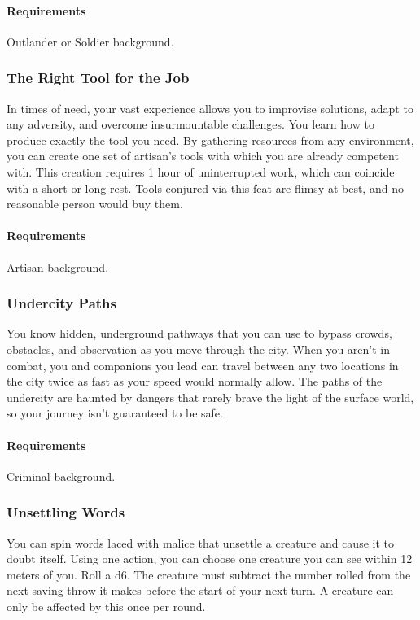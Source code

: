     \paragraph{Requirements} Outlander or Soldier background.
\subsubsection{The Right Tool for the Job} \label{feat::therighttoolforthejob}
    In times of need, your vast experience allows you to improvise solutions, adapt to any adversity, and overcome insurmountable challenges.
    You learn how to produce exactly the tool you need.
    By gathering resources from any environment, you can create one set of artisan's tools with which you are already competent with.
    This creation requires 1 hour of uninterrupted work, which can coincide with a short or long rest.
    Tools conjured via this feat are flimsy at best, and no reasonable person would buy them.
    \paragraph{Requirements} Artisan background.
\subsubsection{Undercity Paths} \label{feat::undercitypaths}
    You know hidden, underground pathways that you can use to bypass crowds, obstacles, and observation as you move through the city.
    When you aren't in combat, you and companions you lead can travel between any two locations in the city twice as fast as your speed would normally allow.
    The paths of the undercity are haunted by dangers that rarely brave the light of the surface world, so your journey isn't guaranteed to be safe.
    \paragraph{Requirements} Criminal background.
\subsubsection{Unsettling Words} \label{feat::unsettlingwords}
    You can spin words laced with malice that unsettle a creature and cause it to doubt itself.
    Using one action, you can choose one creature you can see within 12 meters of you.
    Roll a d6.
    The creature must subtract the number rolled from the next saving throw it makes before the start of your next turn.
    A creature can only be affected by this once per round.

